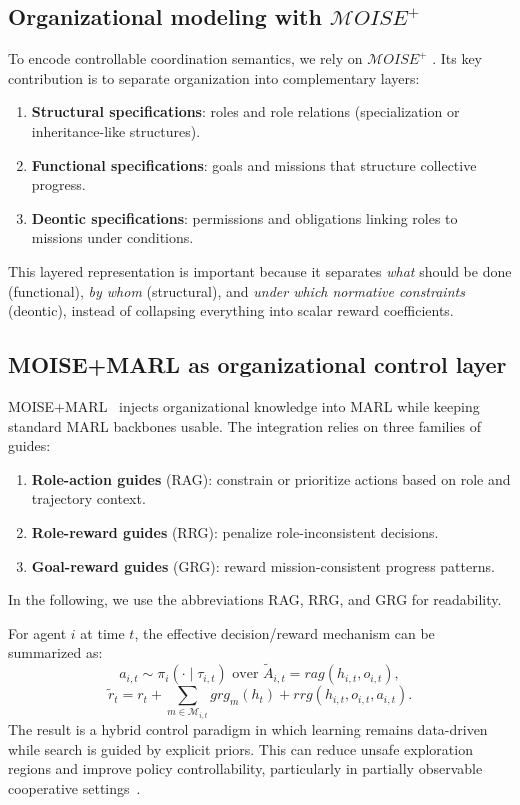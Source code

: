 \documentclass[sigconf]{aamas}
\begin{document}
\subsection{Organizational modeling with $\mathcal{M}OISE^+$}
To encode controllable coordination semantics, we rely on $\mathcal{M}OISE^+$ \cite{Hubner2002,Hubner2007}. Its key contribution is to separate organization into complementary layers:
\begin{enumerate}
    \item \textbf{Structural specifications}: roles and role relations (specialization or inheritance-like structures).
    \item \textbf{Functional specifications}: goals and missions that structure collective progress.
    \item \textbf{Deontic specifications}: permissions and obligations linking roles to missions under conditions.
\end{enumerate}
This layered representation is important because it separates \emph{what} should be done (functional), \emph{by whom} (structural), and \emph{under which normative constraints} (deontic), instead of collapsing everything into scalar reward coefficients.

\subsection{MOISE+MARL as organizational control layer}
MOISE+MARL~\cite{soule2024moise_marl} injects organizational knowledge into MARL while keeping standard MARL backbones usable. The integration relies on three families of guides:
\begin{enumerate}
    \item \textbf{Role-action guides} (RAG): constrain or prioritize actions based on role and trajectory context.
    \item \textbf{Role-reward guides} (RRG): penalize role-inconsistent decisions.
    \item \textbf{Goal-reward guides} (GRG): reward mission-consistent progress patterns.
\end{enumerate}
In the following, we use the abbreviations RAG, RRG, and GRG for readability.

For agent $i$ at time $t$, the effective decision/reward mechanism can be summarized as:
\[
    a_{i,t} \sim \pi_i(\cdot \mid \tau_{i,t}) \text{ over } \tilde{A}_{i,t}=rag(h_{i,t},o_{i,t}),
\]
\[
    \tilde{r}_t = r_t + \sum_{m \in \mathcal{M}_{i,t}} grg_m(h_t) + rrg(h_{i,t},o_{i,t},a_{i,t}).
\]
The result is a hybrid control paradigm in which learning remains data-driven while search is guided by explicit priors. This can reduce unsafe exploration regions and improve policy controllability, particularly in partially observable cooperative settings~\cite{soule2024moise_marl,Chai2025survey}.
\end{document}
